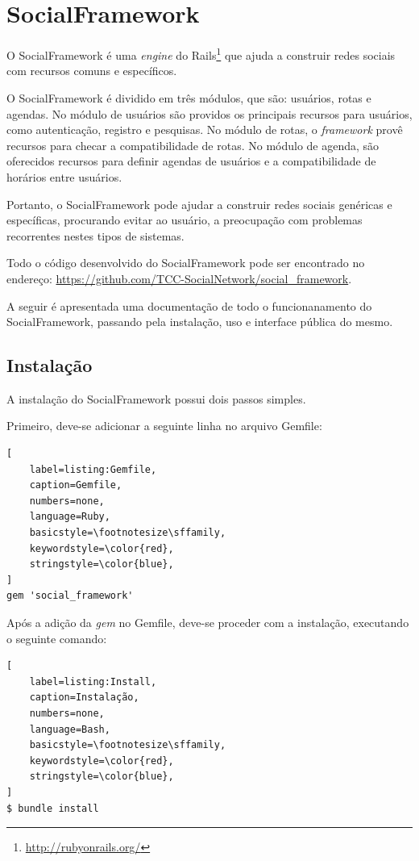 \chapter{SocialFramework}
\label{chapter:SocialFramework}

O SocialFramework é uma \textit{engine} do Rails\footnote{\url{http://rubyonrails.org/}} que ajuda a construir redes sociais com recursos comuns e específicos.

O SocialFramework é dividido em três módulos, que são: usuários, rotas e agendas. No módulo de usuários são providos os principais recursos para usuários, como autenticação, registro e pesquisas. No módulo de rotas, o \textit{framework} provê recursos para checar a compatibilidade de rotas. No módulo de agenda, são oferecidos recursos para definir agendas de usuários e a compatibilidade de horários entre usuários.

Portanto, o SocialFramework pode ajudar a construir redes sociais genéricas e específicas, procurando evitar ao usuário, a preocupação com problemas recorrentes nestes tipos de sistemas.

Todo o código desenvolvido do SocialFramework pode ser encontrado no endereço: \url{https://github.com/TCC-SocialNetwork/social_framework}.

A seguir é apresentada uma documentação de todo o funcionanamento do SocialFramework, passando pela instalação, uso e interface pública do mesmo.

\section{Instalação}

A instalação do SocialFramework possui dois passos simples.

Primeiro, deve-se adicionar a seguinte linha no arquivo Gemfile:

\begin{lstlisting}[
    label=listing:Gemfile,
    caption=Gemfile,
    numbers=none,
    language=Ruby,
    basicstyle=\footnotesize\sffamily,
    keywordstyle=\color{red},
    stringstyle=\color{blue},
]
gem 'social_framework'
\end{lstlisting}

Após a adição da \textit{gem} no Gemfile, deve-se proceder com a instalação, executando o seguinte comando:

\begin{lstlisting}[
    label=listing:Install,
    caption=Instalação,
    numbers=none,
    language=Bash,
    basicstyle=\footnotesize\sffamily,
    keywordstyle=\color{red},
    stringstyle=\color{blue},
]
$ bundle install
\end{lstlisting}

